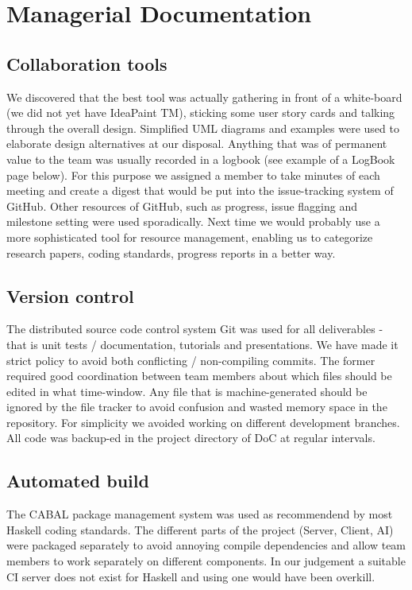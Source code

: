 \documentclass[pdftex,11pt,a4paper]{report}
\begin{document}

\section{Managerial Documentation}

\subsection{Collaboration tools}
We discovered that the best tool was actually gathering in front of a
white-board (we did not yet have IdeaPaint TM), sticking some user
story cards and talking through the overall design. Simplified UML
diagrams and examples were used to elaborate design alternatives at
our disposal. Anything that was of permanent value to the team was
usually recorded in a logbook (see example of a LogBook page
below). For this purpose we assigned a member to take minutes of each
meeting and create a digest that would be put into the issue-tracking
system of GitHub. Other resources of GitHub, such as progress, issue
flagging and milestone setting were used sporadically. Next time we
would probably use a more sophisticated tool for resource management,
enabling us to categorize research papers, coding standards, progress
reports in a better way.

\subsection{Version control}
The distributed source code control system Git was used for all
deliverables - that is unit tests / documentation, tutorials and
presentations. We have made it strict policy to avoid both conflicting
/ non-compiling commits. The former required good coordination between
team members about which files should be edited in what
time-window. Any file that is machine-generated should be ignored by
the file tracker to avoid confusion and wasted memory space in the
repository. For simplicity we avoided working on different development
branches. All code was backup-ed in the project directory of DoC at
regular intervals.

\subsection{Automated build}
The CABAL package management system was used as recommendend by most
Haskell coding standards. The different parts of the project (Server,
Client, AI) were packaged separately to avoid annoying compile
dependencies and allow team members to work separately on different
components. In our judgement a suitable CI server does not exist for
Haskell and using one would have been overkill.
\end{document}
